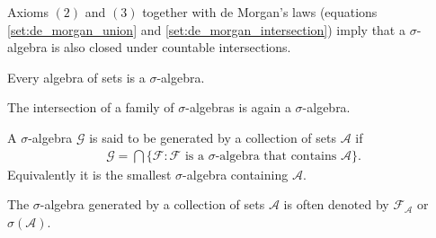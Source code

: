     \begin{remark}
        Axioms $(2)$ and $(3)$ together with de Morgan's laws (equations \ref{set:de_morgan_union} and \ref{set:de_morgan_intersection}) imply that a $\sigma$-algebra is also closed under countable intersections.
    \end{remark}

    \begin{result}
        Every algebra of sets is a $\sigma$-algebra.
    \end{result}

    \begin{property}[Intersections]
        The intersection of a family of $\sigma$-algebras is again a $\sigma$-algebra.
    \end{property}

    \begin{definition}
        A $\sigma$-algebra $\mathcal{G}$ is said to be generated by a collection of sets $\mathcal{A}$ if
        \begin{gather}
            \label{set:generated_sigma_algebra}
            \mathcal{G} = \bigcap\{\mathcal{F}:\mathcal{F} \text{ is a } \sigma\text{-algebra that contains } \mathcal{A}\}.
        \end{gather}
        Equivalently it is the smallest $\sigma$-algebra containing $\mathcal{A}$.
    \end{definition}
    \begin{notation}\label{set:notation:generated_sigma_algebra}
        The $\sigma$-algebra generated by a collection of sets $\mathcal{A}$ is often denoted by $\mathcal{F}_\mathcal{A}$ or $\sigma(\mathcal{A})$.
    \end{notation}

